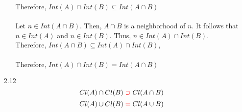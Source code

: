 \documentclass[12pt]{article}
\begin{document}
\begin{enumerate}
\begin{enumerate}
		Therefore, $ Int(A)\cap Int(B) \subseteq Int(A\cap B) $\\
		\\
		Let $ n \in Int(A\cap B) $. Then, $ A\cap B $ is a neighborhood of $ n $. It follows that $ n\in Int(A) $ and $ n\in Int(B) $. Thus, $ n\in Int(A) \cap Int(B) $.\\
		Therefore, $ Int(A\cap B) \subseteq Int(A) \cap Int(B) $,\\
		\\
		Therefore, $ Int(A)\cap Int(B) = Int(A\cap B) $\\
	\end{enumerate}
				 
	\item[2.12] \[Cl(A)\cap Cl(B) \color{red}\supset \color{black} Cl(A\cap B) \]
				\[Cl(A)\cup Cl(B) \color{red}= \color{black} Cl(A\cup B) \]
\end{enumerate}
 
\end{document}
